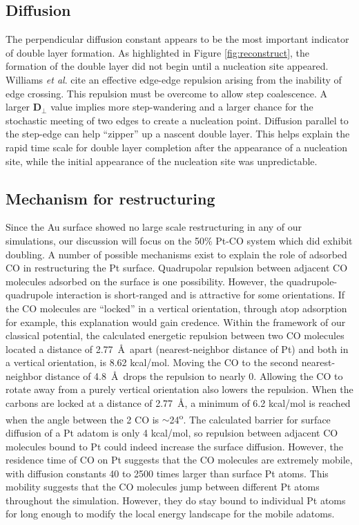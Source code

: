 \subsection{Diffusion}
The perpendicular diffusion constant appears to be the most important
indicator of double layer formation. As highlighted in Figure
\ref{fig:reconstruct}, the formation of the double layer did not begin
until a nucleation site appeared.  Williams {\it et
  al}.\citep{Williams:1994aa, Williams:1991qd} cite an effective edge-edge
repulsion arising from the inability of edge crossing.  This repulsion
must be overcome to allow step coalescence.  A larger
$\textbf{D}_\perp$ value implies more step-wandering and a larger
chance for the stochastic meeting of two edges to create a nucleation
point.  Diffusion parallel to the step-edge can help ``zipper'' up a
nascent double layer. This helps explain the rapid time scale for
double layer completion after the appearance of a nucleation site, while
the initial appearance of the nucleation site was unpredictable.

\subsection{Mechanism for restructuring}
Since the Au surface showed no large scale restructuring in any of our
simulations, our discussion will focus on the 50\% Pt-CO system which
did exhibit doubling. A number of possible mechanisms exist to explain
the role of adsorbed CO in restructuring the Pt surface. Quadrupolar
repulsion between adjacent CO molecules adsorbed on the surface is one
possibility.  However, the quadrupole-quadrupole interaction is
short-ranged and is attractive for some orientations.  If the CO
molecules are ``locked'' in a vertical orientation, through atop
adsorption for example, this explanation would gain credence. Within
the framework of our classical potential, the calculated energetic
repulsion between two CO molecules located a distance of
2.77~\AA~apart (nearest-neighbor distance of Pt) and both in a
vertical orientation, is 8.62 kcal/mol. Moving the CO to the second
nearest-neighbor distance of 4.8~\AA~drops the repulsion to nearly
0. Allowing the CO to rotate away from a purely vertical orientation
also lowers the repulsion. When the carbons are locked at a distance
of 2.77~\AA, a minimum of 6.2 kcal/mol is reached when the angle
between the 2 CO is $\sim$24\textsuperscript{o}.  The calculated
barrier for surface diffusion of a Pt adatom is only 4 kcal/mol, so
repulsion between adjacent CO molecules bound to Pt could indeed
increase the surface diffusion. However, the residence time of CO on
Pt suggests that the CO molecules are extremely mobile, with diffusion
constants 40 to 2500 times larger than surface Pt atoms. This mobility
suggests that the CO molecules jump between different Pt atoms
throughout the simulation.  However, they do stay bound to individual
Pt atoms for long enough to modify the local energy landscape for the
mobile adatoms.

